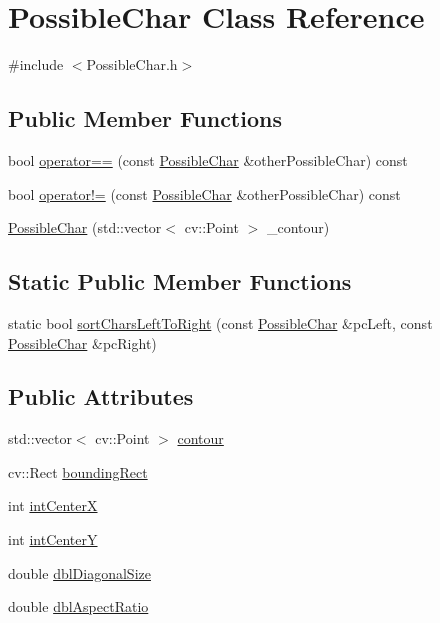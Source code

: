 \hypertarget{class_possible_char}{}\section{Possible\+Char Class Reference}
\label{class_possible_char}


{\ttfamily \#include $<$Possible\+Char.\+h$>$}

\subsection*{Public Member Functions}
\begin{DoxyCompactItemize}
\item 
bool \hyperlink{class_possible_char_a39abf1c52fae2909229dea44feb97a4c}{operator==} (const \hyperlink{class_possible_char}{Possible\+Char} \&other\+Possible\+Char) const
\item 
bool \hyperlink{class_possible_char_acb1c829f46840844252b3572a58d049c}{operator!=} (const \hyperlink{class_possible_char}{Possible\+Char} \&other\+Possible\+Char) const
\item 
\hyperlink{class_possible_char_a80ee7800aef44bb271f0bd4dbfda90ee}{Possible\+Char} (std\+::vector$<$ cv\+::\+Point $>$ \+\_\+contour)
\end{DoxyCompactItemize}
\subsection*{Static Public Member Functions}
\begin{DoxyCompactItemize}
\item 
static bool \hyperlink{class_possible_char_ade8559350ed9386989c3cf9ba4e61b0d}{sort\+Chars\+Left\+To\+Right} (const \hyperlink{class_possible_char}{Possible\+Char} \&pc\+Left, const \hyperlink{class_possible_char}{Possible\+Char} \&pc\+Right)
\end{DoxyCompactItemize}
\subsection*{Public Attributes}
\begin{DoxyCompactItemize}
\item 
std\+::vector$<$ cv\+::\+Point $>$ \hyperlink{class_possible_char_a56b00769066975d6168618b72bdcb14a}{contour}
\item 
cv\+::\+Rect \hyperlink{class_possible_char_a9bcecfe6d2758c542c5963198599cb8f}{bounding\+Rect}
\item 
int \hyperlink{class_possible_char_a94e206c6ed3b314bac7997e48f73fade}{int\+CenterX}
\item 
int \hyperlink{class_possible_char_ad8a87ec7b9d65e4027e8294b3f9f9657}{int\+CenterY}
\item 
double \hyperlink{class_possible_char_a75bdf6078ed3861965a9129403dfac05}{dbl\+Diagonal\+Size}
\item 
double \hyperlink{class_possible_char_a9dd90d8e773a76090eaa336f5ecd4dee}{dbl\+Aspect\+Ratio}
\end{DoxyCompactItemize}



